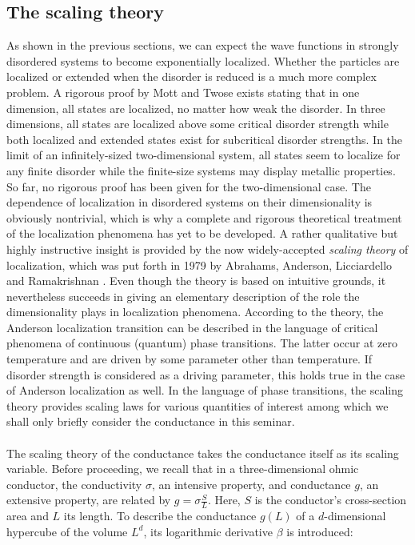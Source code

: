 \documentclass[10pt,a4paper]{article}
\begin{document}
 \subsection{The scaling theory}
As shown in the previous sections, we can expect the wave functions in strongly disordered systems to become exponentially localized. Whether the particles are localized or extended when the disorder is reduced is a much more complex problem. A rigorous proof by Mott and Twose \cite{Mott_Twose} exists stating that in one dimension, all states are localized, no matter how weak the disorder. In three dimensions, all states are localized above some critical disorder strength while both localized and extended states exist for subcritical disorder strengths. In the limit of an infinitely-sized two-dimensional system, all states seem to localize for any finite disorder while the finite-size systems may display metallic properties. So far, no rigorous proof has been given for the two-dimensional case. The dependence of localization in disordered systems on their dimensionality is obviously nontrivial, which is why a complete and rigorous theoretical treatment of the localization phenomena has yet to be developed. A rather qualitative but highly instructive insight is provided by the now widely-accepted \emph{scaling theory} of localization, which was put forth in 1979 by Abrahams, Anderson, Licciardello and Ramakrishnan \cite{scaling}. Even though the theory is based on intuitive grounds, it nevertheless succeeds in giving an elementary description of the role the dimensionality plays in localization phenomena. According to the theory, the Anderson localization transition can be described in the language of critical phenomena of continuous (quantum) phase transitions. The latter occur at zero temperature and are driven by some parameter other than temperature. If disorder strength is considered as a driving parameter, this holds true in the case of Anderson localization as well. In the language of phase transitions, the scaling theory provides scaling laws for various quantities of interest among which we shall only briefly consider the conductance in this seminar. \\\\
\noindent The scaling theory of the conductance takes the conductance itself as its scaling variable. Before proceeding, we recall that in a three-dimensional ohmic conductor, the conductivity $\sigma$, an intensive property, and conductance $g$, an extensive property, are related by $g=\sigma \frac{S}{L}$. Here, $S$ is the conductor's cross-section area and $L$ its length. To describe the conductance $g(L)$ of a $d$-dimensional hypercube of the volume $L^d$, its logarithmic derivative $\beta$ is introduced:
\end{document}
